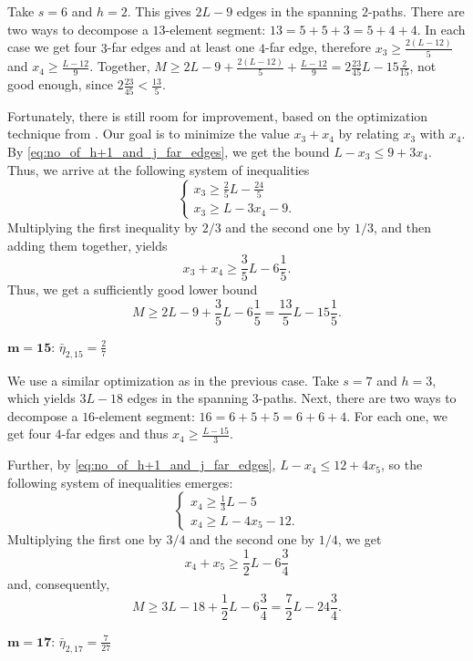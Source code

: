 \documentclass[reqno, 12pt]{amsart}
\numberwithin{equation}{section}
\numberwithin{figure}{section}
\theoremstyle{plain}
\theoremstyle{definition}
\begin{document}
Take $s=6$ and $h=2$. This gives $2L-9$ edges in the spanning $2$-paths. There are two ways to decompose a $13$-element segment: $13=5+5+3=5+4+4$. In each case we get four $3$-far edges and at least one $4$-far edge, therefore $x_3 \geq \frac{2(L-12)}{5}$ and $x_4 \geq \frac{L-12}{9}$. Together, $M \geq 2L - 9 + \frac{2(L-12)}{5} + \frac{L-12}{9} = 2\frac{23}{45}L - 15\frac{2}{15}$, not good enough, since $2\frac{23}{45} < \frac{13}{5}$.

Fortunately, there is still room for improvement, based on the optimization technique from \cite[proof of Thm. 1.5,\; $m=9$]{ADR}.
Our goal is to minimize the value $x_3+x_4$ by relating $x_3$ with $x_4$. By \eqref{eq:no_of_h+1_and_j_far_edges}, we get the bound $L-x_3\le 9+3x_4$.
Thus, we arrive at the following system of inequalities
\[
\begin{cases}
    x_3 \geq \frac25 L - \frac{24}{5} \\
    x_3 \geq L - 3x_4 - 9.
\end{cases}
\]
Multiplying the first inequality by $2/3$ and the second one by $1/3$, and then adding them together, yields
\[
x_3+x_4 \ge \frac{3}{5} L - 6\frac15.
\]
Thus, we get a sufficiently good lower bound
\[M \geq 2L-9+\frac35L-6\frac{1}{5} = \frac{13}{5}L - 15\frac{1}{5}.\]

\medskip
	
    $\mathbf{m=15}$: $\bar \eta_{2,15}= \frac27$

\medskip

We use a similar optimization as in the previous case. Take $s=7$ and $h=3$, which yields $3L-18$ edges in the spanning $3$-paths. Next, there are two ways to decompose a $16$-element segment: $16=6+5+5=6+6+4$. For each one, we get four $4$-far edges and thus $x_4 \geq \frac{L-15}{3}$.

Further, by \eqref{eq:no_of_h+1_and_j_far_edges},  $L-x_4\le 12+4x_5$, so  the following system of inequalities emerges:
\[
\begin{cases}
    x_4 \geq \frac{1}{3}L - 5 \\
    x_4 \geq L - 4x_5 - 12.
\end{cases}
\]
Multiplying the first one by $3/4$ and the second one by $1/4$, we get
\[ x_4 + x_5 \geq \frac12L - 6\frac34\]
and, consequently,
\[ M \geq 3L - 18 + \frac12L - 6\frac34 = \frac72L - 24\frac34. \]

\medskip

$\mathbf{m=17}$: $\bar \eta_{2,17}=\frac7{27}$

\medskip
\end{document}
